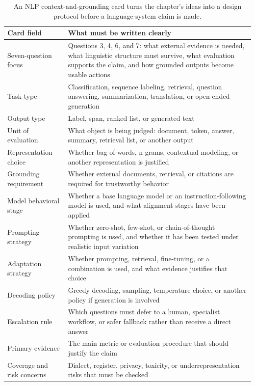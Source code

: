\begin{table}[t]
\centering
\small
\setlength{\tabcolsep}{4pt}
\begin{tabular}{p{3.25cm}p{6.98cm}}
\toprule
Card field & What must be written clearly \\
\midrule
Seven-question focus & Questions 3, 4, 6, and 7: what external evidence is needed, what linguistic structure must survive, what evaluation supports the claim, and how grounded outputs become usable actions \\
Task type & Classification, sequence labeling, retrieval, question answering, summarization, translation, or open-ended generation \\
Output type & Label, span, ranked list, or generated text \\
Unit of evaluation & What object is being judged: document, token, answer, summary, retrieval list, or another output \\
Representation choice & Whether bag-of-words, n-grams, contextual modeling, or another representation is justified \\
Grounding requirement & Whether external documents, retrieval, or citations are required for trustworthy behavior \\
Model behavioral stage & Whether a base language model or an instruction-following model is used, and what alignment stages have been applied \\
Prompting strategy & Whether zero-shot, few-shot, or chain-of-thought prompting is used, and whether it has been tested under realistic input variation \\
Adaptation strategy & Whether prompting, retrieval, fine-tuning, or a combination is used, and what evidence justifies that choice \\
Decoding policy & Greedy decoding, sampling, temperature choice, or another policy if generation is involved \\
Escalation rule & Which questions must defer to a human, specialist workflow, or safer fallback rather than receive a direct answer \\
Primary evidence & The main metric or evaluation procedure that should justify the claim \\
Coverage and risk concerns & Dialect, register, privacy, toxicity, or underrepresentation risks that must be checked \\
\bottomrule
\end{tabular}
\caption{An NLP context-and-grounding card turns the chapter's ideas into a design protocol before a language-system claim is made.}
\label{tab:nlp-context-grounding-card}
\end{table}

